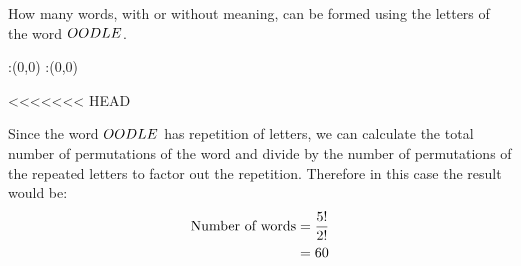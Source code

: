 \question[1] How many words, with or without meaning, can be formed
using the letters of the word $OODLE$.



\watchout

\ifprintanswers
  \begin{marginfigure}
      :(0,0)
      :(0,0)
    \figdrawbegin{}
      \figdrawline [100,101]
    \figdrawend
    \figvisu{\figBoxA}{}{%
    }
    \centerline{\box\figBoxA}
  \end{marginfigure}
\fi 

<<<<<<< HEAD
\begin{solution}
  Since the word $OODLE$ has repetition of letters, we can calculate the
  total number of permutations of the word and divide by the number of
  permutations of the repeated letters to factor out the repetition.
  Therefore in this case the result would be:
  \begin{align}
  	\text{Number of words} &= \dfrac{5!}{2!} \\
  						   &= 60
  \end{align}

\end{solution}
